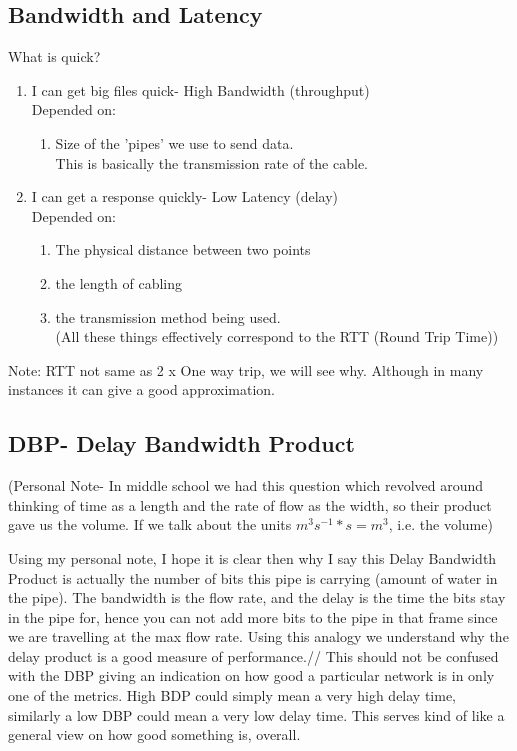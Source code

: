 \documentclass[12pt]{book}
\begin{document}
\subsection{Bandwidth and Latency}
What is quick?
\begin{enumerate}
    \item I can get big files quick- High Bandwidth (throughput)\\
    Depended on:
    \begin{enumerate}
        \item Size of the 'pipes' we use to send data.\\
        This is basically the transmission rate of the cable.
    \end{enumerate}
    \item I can get a response quickly- Low Latency (delay)\\
    Depended on:
    \begin{enumerate}
        \item The physical distance between two points
        \item the length of cabling
        \item the transmission method being used.\\
        (All these things effectively correspond to the RTT (Round Trip Time))
    \end{enumerate}
\end{enumerate}
Note: RTT not same as 2 x One way trip, we will see why. Although in many instances it can give a good approximation.

\subsection{DBP- Delay Bandwidth Product}
(Personal Note- In middle school we had this question which revolved around thinking of time as a length and the rate of flow as the width, so their product gave us the volume. If we talk about the units $m^{3}s^{-1} * s = m^{3}$, i.e. the volume)

Using my personal note, I hope it is clear then why I say this Delay Bandwidth Product is actually the number of bits this pipe is carrying (amount of water in the pipe). The bandwidth is the flow rate, and the delay is the time the bits stay in the pipe for, hence you can not add more bits to the pipe in that frame since we are travelling at the max flow rate. Using this analogy we understand why the delay product is a good measure of performance.//
This should not be confused with the DBP giving an indication on how good a particular network is in only one of the metrics. High BDP could simply mean a very high delay time, similarly a low DBP could mean a very low delay time. This serves kind of like a general view on how good something is, overall.
\end{document}
